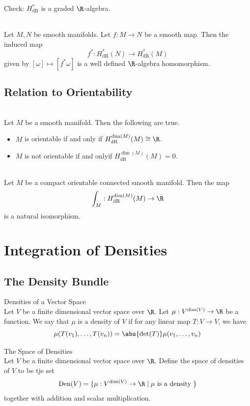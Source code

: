 \documentclass[a4paper]{article}
\begin{document}
Check: $H_\text{dR}^\ast$ is a graded $\R$-algebra. 

\begin{prp}{}{}\\
Let $M,N$ be smooth manifolds. Let $f:M\to N$ be a smooth map. Then the induced map $$f^\ast:H_\text{dR}^\ast(N)\to H_\text{dR}^\ast(M)$$ given by $[\omega]\mapsto[f^\ast\omega]$ is a well defined $\R$-algebra homomorphism. 
\end{prp}

\subsection{Relation to Orientability}
\begin{prp}{}{}\\
Let $M$ be a smooth manifold. Then the following are true. 
\begin{itemize}
\item $M$ is orientable if and only if $H_\text{dR}^{\dim(M)}(M)\cong\R$. 
\item $M$ is not orientable if and onlyif $H_\text{dR}^{\dim(M)}(M)=0$. 
\end{itemize}
\end{prp}

\begin{prp}{}{}\\
Let $M$ be a compact orientable connected smooth manifold. Then the map $$\int_M:H_\text{dR}^{\dim(M)}(M)\to\R$$ is a natural isomorphism. 
\end{prp}

\pagebreak
\section{Integration of Densities}
\subsection{The Density Bundle}
\begin{defn}{Densities of a Vector Space}{}\\
Let $V$ be a finite dimensional vector space over $\R$. Let $\mu:V^{\dim(V)}\to\R$ be a function. We say that $\mu$ is a density of $V$ if for any linear map $T:V\to V$, we have $$\mu(T(v_1),\dots,T(v_n))=\abs{\det(T)}\mu(v_1,\dots,v_n)$$
\end{defn}

\begin{defn}{The Space of Densities}{}\\
Let $V$ be a finite dimensional vector space over $\R$. Define the space of densities of $V$ to be tje set $$\text{Den}(V)=\{\mu:V^{\dim(V)}\to\R\;|\;\mu\text{ is a density }\}$$ together with addition and scalar multiplication. 
\end{defn}
\end{document}
